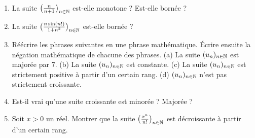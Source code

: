\begin{frame}
	\begin{miniexercice}
	\begin{enumerate}
  \item La suite $\big(\frac{n}{n+1}\big)_{n\in \mathbb{N}}$ est-elle monotone ? Est-elle bornée ?
  \item La suite $\big(\frac{n\sin(n!)}{1+n^2}\big)_{n\in \mathbb{N}}$ est-elle bornée ?
  \item Réécrire les phrases suivantes en une phrase mathématique. 
  \'Ecrire ensuite la négation mathématique de chacune des phrases.
  (a) La suite $(u_n)_{n\in\mathbb{N}}$ est majorée par $7$.
  (b) La suite $(u_n)_{n\in\mathbb{N}}$ est constante.
  (c) La suite $(u_n)_{n\in\mathbb{N}}$ est strictement positive à partir d'un certain rang.
  (d) $(u_n)_{n\in\mathbb{N}}$ n'est pas strictement croissante.
  \item Est-il vrai qu'une suite croissante est minorée ? Majorée ?
  \item Soit $x>0$ un réel. Montrer que la suite $\left(\frac{x^n}{n!}\right)_{n\in \mathbb{N}}$ 
  est décroissante à partir d'un certain rang. 
\end{enumerate}
\end{miniexercice}


\end{frame}


